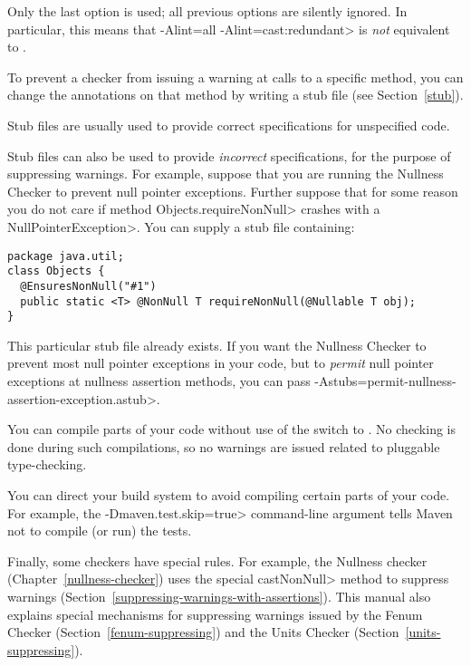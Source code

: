 Only the last  option is used; all previous 
options are silently ignored.  In particular, this means that \<-Alint=all
-Alint=cast:redundant> is \emph{not} equivalent to
.



To prevent a checker from issuing a warning at calls to a specific method,
you can change the annotations on that method by writing a stub file (see
Section~\ref{stub}).

Stub files are usually used to provide correct specifications for
unspecified code.

Stub files can also be used to provide \emph{incorrect} specifications, for
the purpose of suppressing warnings.  For example, suppose that you are
running the Nullness Checker to prevent null pointer exceptions.  Further
suppose that for some reason you do not care if method
\<Objects.requireNonNull> crashes with a \<NullPointerException>.  You can
supply a stub file containing:

\begin{Verbatim}
package java.util;
class Objects {
  @EnsuresNonNull("#1")
  public static <T> @NonNull T requireNonNull(@Nullable T obj);
}
\end{Verbatim}

This particular stub file already exists.
If you want the Nullness Checker to prevent most null
pointer exceptions in your code, but to \emph{permit} null pointer
exceptions at nullness assertion methods, you can pass
\<-Astubs=permit-nullness-assertion-exception.astub>.



You can compile parts of your code without use of the
 switch to .  No checking is done during
such compilations, so no warnings are issued related to pluggable
type-checking.

You can direct your build system to avoid compiling certain parts of your
code.  For example, the \<-Dmaven.test.skip=true> command-line argument
tells Maven not to compile (or run) the tests.



Finally, some checkers have special rules.  For example, the Nullness
checker (Chapter~\ref{nullness-checker}) uses
the special \<castNonNull> method to suppress warnings
(Section~\ref{suppressing-warnings-with-assertions}).
This manual also explains special mechanisms for
suppressing warnings issued by the Fenum Checker
(Section~\ref{fenum-suppressing}) and the Units Checker
(Section~\ref{units-suppressing}).


